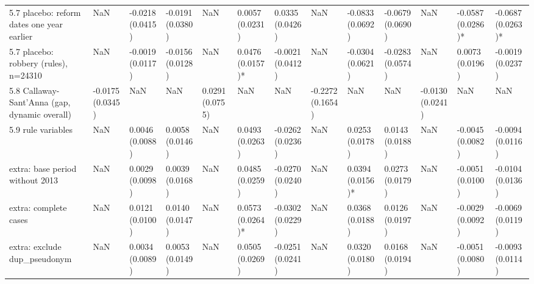 \begin{table}
\begin{tabular}{lllllllllllll}
5.7 placebo: reform dates one year earlier & NaN & -0.0218 (0.0415) & -0.0191 (0.0380) & NaN & 0.0057 (0.0231) & 0.0335 (0.0426) & NaN & -0.0833 (0.0692) & -0.0679 (0.0690) & NaN & -0.0587 (0.0286)* & -0.0687 (0.0263)* \\
5.7 placebo: robbery (rules), n=24310 & NaN & -0.0019 (0.0117) & -0.0156 (0.0128) & NaN & 0.0476 (0.0157)* & -0.0021 (0.0412) & NaN & -0.0304 (0.0621) & -0.0283 (0.0574) & NaN & 0.0073 (0.0196) & -0.0019 (0.0237) \\
5.8 Callaway-Sant'Anna (gap, dynamic overall) & -0.0175 (0.0345) & NaN & NaN & 0.0291 (0.0755) & NaN & NaN & -0.2272 (0.1654) & NaN & NaN & -0.0130 (0.0241) & NaN & NaN \\
5.9 rule variables & NaN & 0.0046 (0.0088) & 0.0058 (0.0146) & NaN & 0.0493 (0.0263) & -0.0262 (0.0236) & NaN & 0.0253 (0.0178) & 0.0143 (0.0188) & NaN & -0.0045 (0.0082) & -0.0094 (0.0116) \\
extra: base period without 2013 & NaN & 0.0029 (0.0098) & 0.0039 (0.0168) & NaN & 0.0485 (0.0259) & -0.0270 (0.0240) & NaN & 0.0394 (0.0156)* & 0.0273 (0.0179) & NaN & -0.0051 (0.0100) & -0.0104 (0.0136) \\
extra: complete cases & NaN & 0.0121 (0.0100) & 0.0140 (0.0147) & NaN & 0.0573 (0.0264)* & -0.0302 (0.0229) & NaN & 0.0368 (0.0188) & 0.0126 (0.0197) & NaN & -0.0029 (0.0092) & -0.0069 (0.0119) \\
extra: exclude dup\_pseudonym & NaN & 0.0034 (0.0089) & 0.0053 (0.0149) & NaN & 0.0505 (0.0269) & -0.0251 (0.0241) & NaN & 0.0320 (0.0180) & 0.0168 (0.0194) & NaN & -0.0051 (0.0080) & -0.0093 (0.0114) \\
\bottomrule
\end{tabular}
\end{table}
